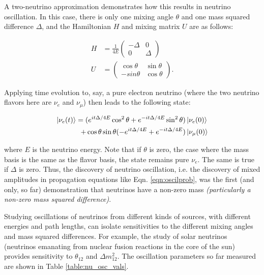 A two-neutrino approximation demonstrates how this results in neutrino oscillation.  In this case, there is only one mixing angle $\theta$ and one mass squared difference $\Delta$, and the Hamiltonian $H$ and mixing matrix $U$ are as follows:

\begin{equation}
\begin{aligned}
H &= \frac{1}{4 E} \begin{pmatrix}
-\Delta & 0 \\
0 & \Delta
\end{pmatrix} \\
U &= \begin{pmatrix}
\cos \theta & \sin \theta \\
-sin \theta & \cos \theta
\end{pmatrix}.
\end{aligned}
\end{equation}

\noindent
Applying time evolution to, say, a pure electron neutrino (where the two neutrino flavors here are $\nu_{e}$ and $\nu_{\mu}$) then leads to the following state:

\begin{equation}
\begin{aligned}
\ket{\nu_{e}(t)} = (e^{i t \Delta / 4 E} \cos^{2} \theta + e^{-i t \Delta / 4 E} \sin^{2} \theta) &\ket{\nu_{e}(0)} \\ + \cos \theta \sin \theta (-e^{i t \Delta / 4 E} + e^{-i t \Delta / 4 E}) &\ket{\nu_{\mu}(0)}
\end{aligned}
\label{eqn:oscilprob}
\end{equation}

\noindent
where $E$ is the neutrino energy.  Note that if $\theta$ is zero, the case where the mass basis is the same as the flavor basis, the state remains pure $\nu_{e}$.  The same is true if $\Delta$ is zero.  Thus, the discovery of neutrino oscillation, i.e. the discovery of mixed amplitudes in propagation equations like Eqn. \ref{eqn:oscilprob}, was the first (and only, so far) demonstration that neutrinos have a non-zero mass \emph{\color{gray}(particularly a non-zero mass squared difference)}.

Studying oscillations of neutrinos from different kinds of sources, with different energies and path lengths, can isolate sensitivities to the different mixing angles and mass squared differences.  For example, the study of solar neutrinos (neutrinos emanating from nuclear fusion reactions in the core of the sun) provides sensitivity to $\theta_{12}$ and $\Delta m_{12}^{2}$.  The oscillation parameters so far measured are shown in Table  \ref{table:nu_osc_vals}.

